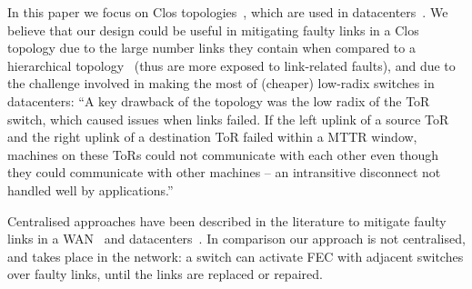 In this paper we focus on Clos
topologies~\cite{clos_bstj1953}, 
which are used in datacenters~\cite{Singh:2016:JRD:2991470.2975159}.
We believe that our design could be useful in mitigating faulty links in a Clos
topology due to the large number links they contain when compared to a
hierarchical topology~\cite{Al-Fares:2008:SCD:1402946.1402967} (thus are more exposed to link-related faults), and due
to the challenge involved in making the most of (cheaper) low-radix switches in datacenters:
``A key drawback of the topology was the low radix of
the ToR switch, which caused issues when links failed.
If the left uplink of a source ToR and the right uplink
of  a  destination  ToR  failed  within  a  MTTR  window,
machines  on  these  ToRs  could  not  communicate  with
each other even though they could communicate with
other machines -- an intransitive disconnect not handled
well by applications.''~\cite[\S3.1]{Singh:2016:JRD:2991470.2975159}

Centralised approaches have been described in the literature to mitigate
faulty links in a WAN~\cite{traffic-engineering-with-forward-fault-correction}
and datacenters~\cite{Zhuo:2017:UMP:3098822.3098849}. In comparison our approach
is not centralised, and takes place in the network: a switch can activate
FEC with adjacent switches over faulty links, until the links are replaced or
repaired.
